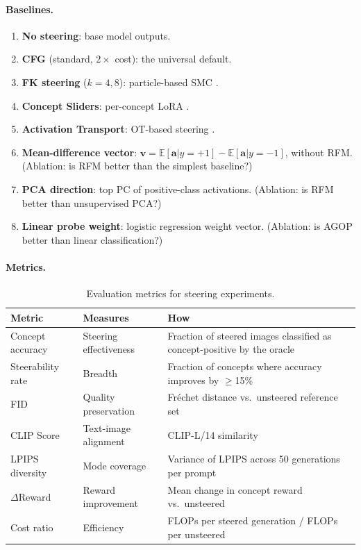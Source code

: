 \documentclass[11pt]{article}
\newcommand{\E}{\mathbb{E}}
\newcommand{\ba}{\mathbf{a}}
\newcommand{\bv}{\mathbf{v}}
\begin{document}
\paragraph{Baselines.}
\begin{enumerate}[leftmargin=*]
    \item \textbf{No steering}: base model outputs.
    \item \textbf{CFG} (standard, $2\times$ cost): the universal default.
    \item \textbf{FK steering} ($k = 4, 8$): particle-based SMC \citep{singhal2025fksteering}.
    \item \textbf{Concept Sliders}: per-concept LoRA \citep{gandikota2023concept}.
    \item \textbf{Activation Transport}: OT-based steering \citep{lyu2025activation}.
    \item \textbf{Mean-difference vector}: $\bv = \E[\ba | y = +1] - \E[\ba | y = -1]$, without RFM. (Ablation: is RFM better than the simplest baseline?)
    \item \textbf{PCA direction}: top PC of positive-class activations. (Ablation: is RFM better than unsupervised PCA?)
    \item \textbf{Linear probe weight}: logistic regression weight vector. (Ablation: is AGOP better than linear classification?)
\end{enumerate}

\paragraph{Metrics.}

\begin{table}[h]
\centering
\caption{Evaluation metrics for steering experiments.}
\label{tab:metrics}
\begin{tabular}{llp{7cm}}
\toprule
\textbf{Metric} & \textbf{Measures} & \textbf{How} \\
\midrule
Concept accuracy & Steering effectiveness & Fraction of steered images classified as concept-positive by the oracle \\
Steerability rate & Breadth & Fraction of concepts where accuracy improves by $\geq$15\% \\
FID & Quality preservation & Fr\'{e}chet distance vs.\ unsteered reference set \\
CLIP Score & Text-image alignment & CLIP-L/14 similarity \\
LPIPS diversity & Mode coverage & Variance of LPIPS across 50 generations per prompt \\
$\Delta$Reward & Reward improvement & Mean change in concept reward vs.\ unsteered \\
Cost ratio & Efficiency & FLOPs per steered generation / FLOPs per unsteered \\
\bottomrule
\end{tabular}
\end{table}
\end{document}
